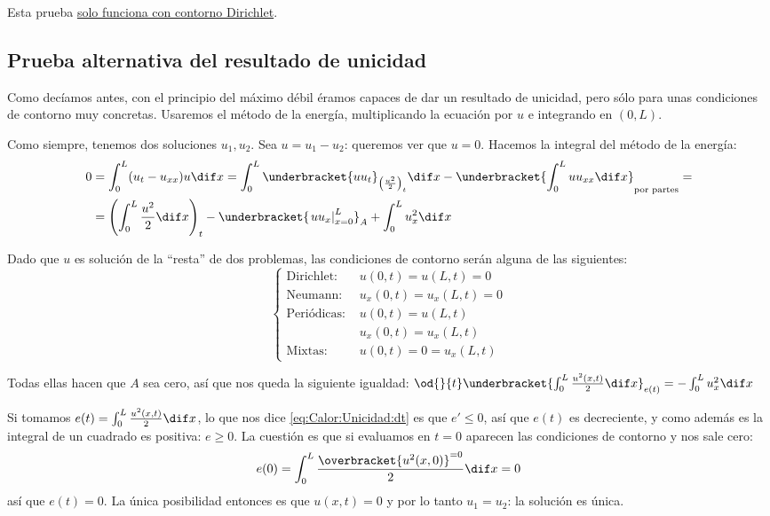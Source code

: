 	\obs Esta prueba \underline{solo funciona con contorno Dirichlet}.


	\newpage %
	\subsection{Prueba alternativa del resultado de unicidad}
		\label{sec:Calor:Unicidad}

		Como decíamos antes, con el principio del máximo débil éramos capaces de dar un resultado de unicidad, pero sólo para unas condiciones de contorno muy concretas. Usaremos el método de la energía, multiplicando la ecuación por $u$ e integrando en $(0,L)$.

		Como siempre, tenemos dos soluciones $u_1, u_2$. Sea $u = u_1 - u_2$: queremos ver que $u = 0$. Hacemos la integral del método de la energía:
		\begin{align*}
			0 &= \int_0^L (u_t-u_{xx}) u \dif x = \int_0^L \underbracket{u u_t}_{\left(\frac{u^2}{2}\right)_t} \dif x - \underbracket{\int_0^L u u_{xx} \dif x}_{\text{por partes}} =  \\
			&= \left(\int_0^L \frac{u^2}{2}\dif x\right)_t - \underbracket{\left. u u_x \right|_{x=0}^L}_{A} + \int_0^L u^2_x \dif x
		\end{align*}

		Dado que $u$ es solución de la ``resta'' de dos problemas, las condiciones de contorno serán alguna de las siguientes:
		\[ \begin{cases}
			\text{Dirichlet: }	& u(0,t) = u(L,t) = 0 \\
			\text{Neumann: }	& u_x(0,t) = u_x(L,t) = 0 \\
			\text{Periódicas: } & u(0,t) = u(L,t) \\
								& u_x(0,t) = u_x(L,t) \\
			\text{Mixtas: }	& u(0,t) = 0 = u_x(L,t)
		\end{cases}\]

		Todas ellas hacen que $A$ sea cero, así que nos queda la siguiente igualdad:
		\( \od{}{t} \underbracket{\int_0^L \frac{u^2(x,t)}{2} \dif x}_{e(t)} = - \int_0^L u^2_x \dif x \label{eq:Calor:Unicidad:dt} \)

		Si tomamos $e(t) = \int_0^L \frac{u^2(x,t)}{2} \dif x$, lo que nos dice \eqref{eq:Calor:Unicidad:dt} es que $e' ≤ 0$, así que $e(t)$ es decreciente, y como además es la integral de un cuadrado es positiva: $e ≥ 0$. La cuestión es que si evaluamos en $t = 0$ aparecen las condiciones de contorno y nos sale cero: \[ e(0) = \int_0^L \frac{\overbracket{u^2(x,0)}^{=0}}{2} \dif x = 0 \] así que $e (t) = 0$. La única posibilidad entonces es que $u(x,t) = 0$ y por lo tanto $u_1 = u_2$: la solución es única.

